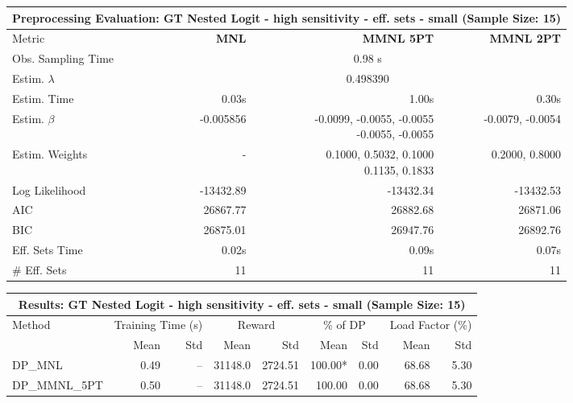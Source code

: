 
\begin{samepage}
\begin{center}
  \small
  \begin{tabular}{l|r|r|r}
    \toprule
    \multicolumn{4}{c}{\textbf{Preprocessing Evaluation: GT Nested Logit - high sensitivity - eff. sets - small (Sample Size: 15)}} \\
    \midrule
    Metric & \textbf{MNL} & \textbf{MMNL 5PT} & \textbf{MMNL 2PT} \\
    \midrule
    Obs. Sampling Time & \multicolumn{3}{c}{0.98 s} \\
    Estim. $\lambda$ & \multicolumn{3}{c}{0.498390} \\
    Estim. Time & 0.03s & 1.00s & 0.30s \\
    Estim. $\beta$ & -0.005856 & \makecell[tr]{-0.0099, -0.0055, -0.0055 \\ -0.0055, -0.0055} & -0.0079, -0.0054 \\
    Estim. Weights & - & \makecell[tr]{0.1000, 0.5032, 0.1000 \\ 0.1135, 0.1833} & 0.2000, 0.8000 \\
    Log Likelihood & -13432.89 & -13432.34 & -13432.53 \\
    AIC & 26867.77 & 26882.68 & 26871.06 \\
    BIC & 26875.01 & 26947.76 & 26892.76 \\
    Eff. Sets Time & 0.02s & 0.09s & 0.07s \\
    \# Eff. Sets & 11 & 11 & 11 \\
    \bottomrule
  \end{tabular}
\end{center}
\begin{center}
  \small
  \begin{tabular}{l|rr|rr|rr|rr}
    \toprule
    \multicolumn{9}{c}{\textbf{Results: GT Nested Logit - high sensitivity - eff. sets - small (Sample Size: 15)}} \\
    \midrule
    Method & \multicolumn{2}{c|}{Training Time (s)} & \multicolumn{2}{c|}{Reward} & \multicolumn{2}{c|}{\% of DP} & \multicolumn{2}{c}{Load Factor (\%)} \\
    & Mean & Std & Mean & Std & Mean & Std & Mean & Std \\
    \midrule
    DP\_MNL      &     0.49 &    -- &    31148.0 &    2724.51 & 100.00* &    0.00 &   68.68 &    5.30 \\
    DP\_MMNL\_5PT &     0.50 &    -- &    31148.0 &    2724.51 &  100.00 &    0.00 &   68.68 &    5.30 \\

\end{tabular}
\end{center}
\end{samepage}
